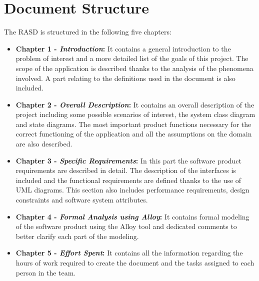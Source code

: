 \section{Document Structure}

The RASD is structured in the following five chapters:
\begin{itemize}
\item \textbf{Chapter 1 -  \textit{Introduction}:} It contains a general introduction to the problem of interest and a more detailed list of the goals of this project. The scope of the application is described thanks to the analysis of the phenomena involved.
A part relating to the definitions used in the document is also included.

\item \textbf{Chapter 2 -  \textit{Overall Description}:} It contains an overall description of the project including some possible scenarios of interest, the system class diagram and state diagrams.
The most important product functions necessary for the correct functioning of the application and all the assumptions on the domain are also described.

\item \textbf{Chapter 3 -  \textit{Specific Requirements}:} In this part the software product requirements are described in detail.
The description of the interfaces is included and the functional requirements are defined thanks to the use of UML diagrams.
This section also includes performance requirements, design constraints and software system attributes.

\item \textbf{Chapter 4 -  \textit{Formal Analysis using Alloy}:} It contains formal modeling of the software product using the Alloy tool and dedicated comments to better clarify each part of the modeling.

\item \textbf{Chapter 5 -  \textit{Effort Spent}:} It contains all the information regarding the hours of work required to create the document and the tasks assigned to each person in the team.
\end{itemize}
